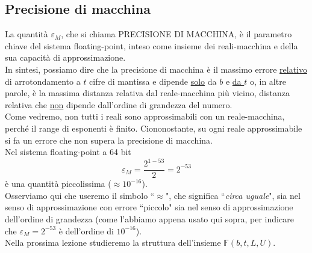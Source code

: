 \subsection{Precisione di macchina}
La quantità $\varepsilon_M$, che si chiama PRECISIONE DI MACCHINA, è il parametro chiave del sistema floating-point, inteso come insieme dei reali-macchina e della sua capacità di approssimazione. \\
In sintesi, possiamo dire che la precisione di macchina è il massimo errore \uline{relativo} di arrotondamento a $t$ cifre di mantissa e dipende \uline{solo} da $b$ e \uline{da $t$} o, in altre parole, è la massima distanza relativa dal reale-macchina più vicino, distanza relativa che \uline{non} dipende dall'ordine di grandezza del numero. \\
Come vedremo, non tutti i reali sono approssimabili con un reale-macchina, perché il range di esponenti è finito. Ciononostante, su ogni reale approssimabile si fa un errore che non supera la precisione di macchina. \\
Nel sistema floating-point a 64 bit \[ \varepsilon_M = \frac{2^{1-53}}{2} = 2^{-53}\] 
è una quantità piccolissima ($\approx 10^{-16}$). \\
Osserviamo qui che useremo il simbolo ``$\approx$", che significa ``\textit{circa uguale}", sia nel senso di approssimazione con errore ``piccolo" sia nel senso di approssimazione dell'ordine di grandezza (come l'abbiamo appena usato qui sopra, per indicare che $\varepsilon_M = 2^{-53}$ è dell'ordine di $10^{-16}$). \\
Nella prossima lezione studieremo la struttura dell'insieme $\mathbb{F}(b, t, L, U)$.
\newpage